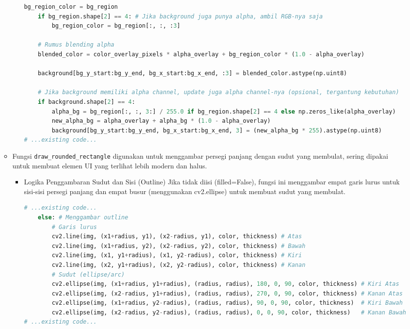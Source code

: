 \documentclass[11pt,a4paper]{article}
\begin{document}
\begin{itemize}
\begin{itemize}
\begin{itemize}
\begin{lstlisting}[language=Python, caption=Logika blending alpha]
    bg_region_color = bg_region
    if bg_region.shape[2] == 4: # Jika background juga punya alpha, ambil RGB-nya saja
        bg_region_color = bg_region[:, :, :3]

    # Rumus blending alpha
    blended_color = color_overlay_pixels * alpha_overlay + bg_region_color * (1.0 - alpha_overlay)
    
    background[bg_y_start:bg_y_end, bg_x_start:bg_x_end, :3] = blended_color.astype(np.uint8)

    # Jika background memiliki alpha channel, update juga alpha channel-nya (opsional, tergantung kebutuhan)
    if background.shape[2] == 4:
        alpha_bg = bg_region[:, :, 3:] / 255.0 if bg_region.shape[2] == 4 else np.zeros_like(alpha_overlay)
        new_alpha_bg = alpha_overlay + alpha_bg * (1.0 - alpha_overlay)
        background[bg_y_start:bg_y_end, bg_x_start:bg_x_end, 3] = (new_alpha_bg * 255).astype(np.uint8)
# ...existing code...
\end{lstlisting}
\end{itemize}

\item Fungsi \texttt{draw\_rounded\_rectangle} digunakan untuk menggambar persegi panjang dengan sudut yang membulat, sering dipakai untuk membuat elemen UI yang terlihat lebih modern dan halus.
\begin{itemize}
\item Logika Penggambaran Sudut dan Sisi (Outline)
\newline Jika tidak diisi (filled=False), fungsi ini menggambar empat garis lurus untuk sisi-sisi persegi panjang dan empat busur (menggunakan cv2.ellipse) untuk membuat sudut yang membulat.
\begin{lstlisting}[language=Python, caption=Logika penggambaran sudut dan sisi]
# ...existing code...
    else: # Menggambar outline
        # Garis lurus
        cv2.line(img, (x1+radius, y1), (x2-radius, y1), color, thickness) # Atas
        cv2.line(img, (x1+radius, y2), (x2-radius, y2), color, thickness) # Bawah
        cv2.line(img, (x1, y1+radius), (x1, y2-radius), color, thickness) # Kiri
        cv2.line(img, (x2, y1+radius), (x2, y2-radius), color, thickness) # Kanan
        # Sudut (ellipse/arc)
        cv2.ellipse(img, (x1+radius, y1+radius), (radius, radius), 180, 0, 90, color, thickness) # Kiri Atas
        cv2.ellipse(img, (x2-radius, y1+radius), (radius, radius), 270, 0, 90, color, thickness) # Kanan Atas
        cv2.ellipse(img, (x1+radius, y2-radius), (radius, radius), 90, 0, 90, color, thickness)  # Kiri Bawah
        cv2.ellipse(img, (x2-radius, y2-radius), (radius, radius), 0, 0, 90, color, thickness)   # Kanan Bawah
# ...existing code...
\end{lstlisting}


\end{itemize}
\end{itemize}
\end{itemize}
\end{document}
